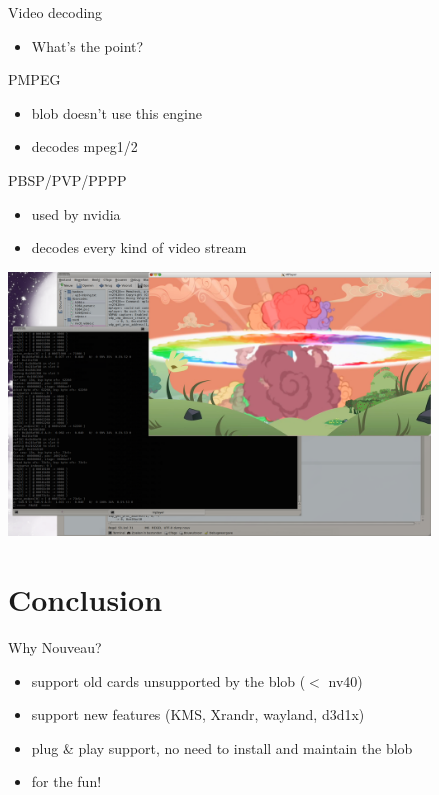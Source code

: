 \documentclass[11pt,english,compress]{beamer}
\begin{document}
		\begin{frame}
			\begin{block}{Video decoding}
				\begin{itemize}
					\item What's the point?
				\end{itemize}
			\end{block}

			\begin{block}{PMPEG}
				\begin{itemize}
					\item blob doesn't use this engine
					\item decodes mpeg1/2
				\end{itemize}
			\end{block}

			\begin{block}{PBSP/PVP/PPPP}
				\begin{itemize}
					\item used by nvidia
					\item decodes every kind of video stream
				\end{itemize}
			\end{block}
		\end{frame}

		\begin{frame}
			\begin{center}
				\includegraphics[height=7cm]{imgs/h264_vp_decoded2.png}
			\end{center}
		\end{frame}

\section{Conclusion}
		\begin{frame}
			\begin{block}{Why Nouveau?}
				\begin{itemize}
					\item support old cards unsupported by the blob ($<$ nv40)
					\item support new features (KMS, Xrandr, wayland, d3d1x)
					\item plug \& play support, no need to install and maintain the blob
					\item for the fun!
				\end{itemize}
			\end{block}
		\end{frame}
\end{document}
